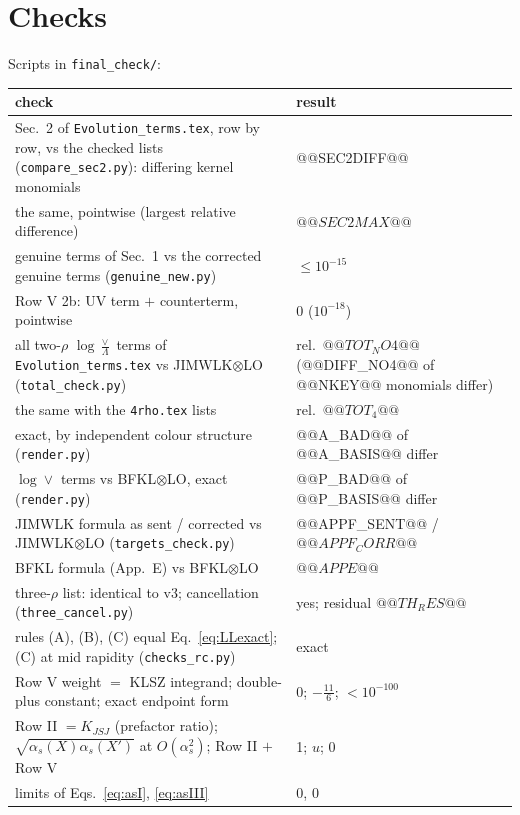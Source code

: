 \documentclass[10pt]{article}
\numberwithin{equation}{section}
\begin{document}
\section{Checks}\label{sec:checks}
Scripts in \texttt{final\_check/}:
\begin{center}\small
\begin{tabular}{@{}p{}p{}@{}}\toprule
check & result\\\midrule
Sec.~2 of \texttt{Evolution\_terms.tex}, row by row, vs the checked lists (\texttt{compare\_sec2.py}): differing kernel monomials & @@SEC2DIFF@@\\
the same, pointwise (largest relative difference) & $@@SEC2MAX@@$\\
genuine terms of Sec.~1 vs the corrected genuine terms (\texttt{genuine\_new.py}) & $\le10^{-15}$\\
Row V 2b: UV term $+$ counterterm, pointwise & 0 ($10^{-18}$)\\
all two-$\rho$ $\log\frac{\vee}{\Lambda}$ terms of \texttt{Evolution\_terms.tex} vs JIMWLK$\otimes$LO (\texttt{total\_check.py}) & rel.\ $@@TOT_NO4@@$ (@@DIFF_NO4@@ of @@NKEY@@ monomials differ)\\
the same with the \texttt{4rho.tex} lists & rel.\ $@@TOT_4@@$\\
exact, by independent colour structure (\texttt{render.py}) & @@A_BAD@@ of @@A_BASIS@@ differ\\
$\log\vee$ terms vs BFKL$\otimes$LO, exact (\texttt{render.py}) & @@P_BAD@@ of @@P_BASIS@@ differ\\
JIMWLK formula as sent / corrected vs JIMWLK$\otimes$LO (\texttt{targets\_check.py}) & @@APPF_SENT@@ / $@@APPF_CORR@@$\\
BFKL formula (App.~E) vs BFKL$\otimes$LO & $@@APPE@@$\\
three-$\rho$ list: identical to v3; cancellation (\texttt{three\_cancel.py}) & yes; residual $@@TH_RES@@$\\
rules (A), (B), (C) equal Eq.~\eqref{eq:LLexact}; (C) at mid rapidity (\texttt{checks\_rc.py}) & exact\\
Row V weight $=$ KLSZ integrand; double-plus constant; exact endpoint form & 0; $-\frac{11}{6}$; $<10^{-100}$\\
Row II $=K_{JSJ}$ (prefactor ratio); $\sqrt{\alpha_s(X)\alpha_s(X')}$ at $O(\alpha_s^2)$; Row II $+$ Row V & 1; $u$; 0\\
limits of Eqs.~\eqref{eq:asI}, \eqref{eq:asIII} & 0, 0\\\bottomrule
\end{tabular}
\end{center}
\end{document}
